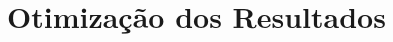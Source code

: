 \documentclass[a4paper,12pt,oneside]{report}
\begin{document}
\section {Otimiza\c{c}\~{a}o dos Resultados}
\end{document}
